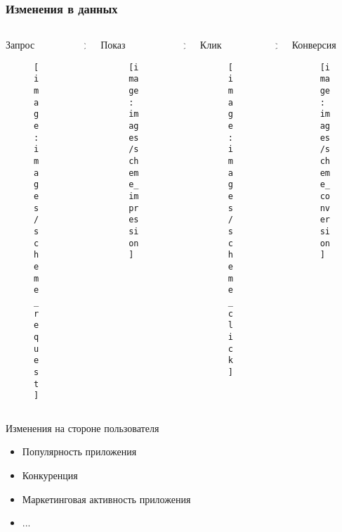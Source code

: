 \documentclass[intlimits, 9pt, unicode]{beamer}
\begin{document}
\begin{frame}
    \frametitle{Изменения в данных}

       \begin{columns}
    \begin{column}{0.25\textwidth}
    \centering
     Запрос
     \begin{figure}
	\texttt{[image: images/scheme\_request]}
     \end{figure}
     \end{column}
    \begin{column}{0.001\textwidth}
    \centering
	>
     \end{column}
    \begin{column}{0.25\textwidth}
    \centering
    Показ
     \begin{figure}
	\texttt{[image: images/scheme\_impression]}
     \end{figure}
    \end{column}
    \begin{column}{0.001\textwidth}
    \centering
    >
    \end{column}
    \begin{column}{0.25\textwidth}
    \centering
    Клик
     \begin{figure}
	\texttt{[image: images/scheme\_click]}
     \end{figure}
    \end{column}
    \begin{column}{0.001\textwidth}
    \centering
    >
    \end{column}
    \begin{column}{0.25\textwidth}
    \centering
     Конверсия
     \begin{figure}
	\texttt{[image: images/scheme\_conversion]}
     \end{figure}
     \end{column}
     \end{columns}

             \vspace{1.2cm}

       {\begin{columns}
        \begin{column}{5cm}
        Изменения на стороне пользователя
         \begin{itemize}
    		\item Популярность приложения
		\item Конкуренция
		\item Маркетинговая активность приложения
		\item ...
   	 \end{itemize}
        \end{column}


\end{columns}}
\end{frame}
\end{document}
